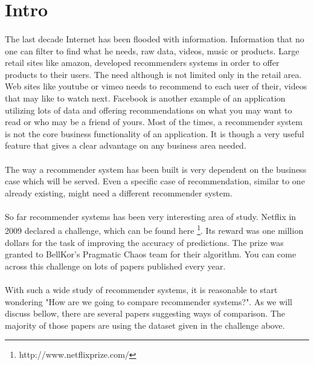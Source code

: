 \section{Intro}
\paragraph{} The last decade Internet has been flooded with information. Information that no one can filter to find what he needs, raw data, videos, music or products. Large retail sites like amazon, developed recommenders systems in order to offer products to their users. The need although is not limited only in the retail area. Web sites like youtube or vimeo needs to recommend to each user of their, videos that may like to watch next. Facebook is another example of an application utilizing lots of data and offering recommendations on what you may want to read or who may be a friend of yours. Most of the times, a recommender system is not the core business functionality of an application. It is though a very useful feature that gives a clear advantage on any business area needed.

\paragraph{}The way a recommender system has been built is very dependent on the business case which will be served. Even a specific case of recommendation, similar to one already existing, might need a different recommender system.

\paragraph{} So far recommender systems has been very interesting area of study. Netflix in 2009 declared a challenge, which can be found here \footnote{http://www.netflixprize.com/}. Its  reward was one million dollars for the task of improving the accuracy of predictions. The prize was granted to BellKor’s Pragmatic Chaos team for their algorithm. You can come across this challenge on lots of papers published every year.

\paragraph{} With such a wide study of recommender systems, it is reasonable to start wondering "How are we going to compare recommender systems?". As we will discuss bellow, there are several papers suggesting ways of comparison. The majority of those papers are using the dataset given in the challenge above.

